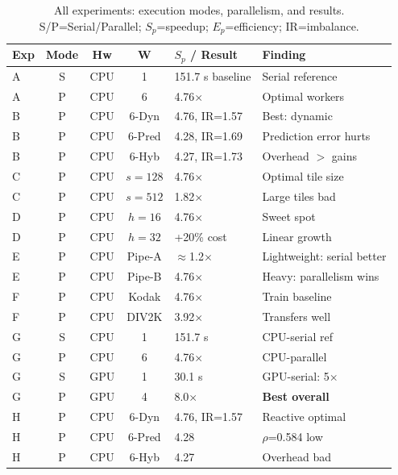 \documentclass[acmsmall]{acmart}
\begin{document}
\begin{table}[htbp]
  \centering
  \small
  \renewcommand{\arraystretch}{0.95}
  \caption{All experiments: execution modes, parallelism, and results. S/P=Serial/Parallel; $S_p$=speedup; $E_p$=efficiency; IR=imbalance.}
  \label{tab:execution_summary}
  \begin{tabularx}{1.0\textwidth}{lcccll}
    \toprule
    \textbf{Exp} & \textbf{Mode} & \textbf{Hw} & \textbf{W} & \textbf{$S_p$ / Result} & \textbf{Finding} \\
    \midrule
    A & S & CPU & 1 & 151.7 s baseline & Serial reference \\
    A & P & CPU & 6 & 4.76$\times$ & Optimal workers \\
    \midrule
    B & P & CPU & 6-Dyn & 4.76, IR=1.57 & Best: dynamic \\
    B & P & CPU & 6-Pred & 4.28, IR=1.69 & Prediction error hurts \\
    B & P & CPU & 6-Hyb & 4.27, IR=1.73 & Overhead $>$ gains \\
    \midrule
    C & P & CPU & $s=128$ & 4.76$\times$ & Optimal tile size \\
    C & P & CPU & $s=512$ & 1.82$\times$ & Large tiles bad \\
    \midrule
    D & P & CPU & $h=16$ & 4.76$\times$ & Sweet spot \\
    D & P & CPU & $h=32$ & +20\% cost & Linear growth \\
    \midrule
    E & P & CPU & Pipe-A & $\approx$1.2$\times$ & Lightweight: serial better \\
    E & P & CPU & Pipe-B & 4.76$\times$ & Heavy: parallelism wins \\
    \midrule
    F & P & CPU & Kodak & 4.76$\times$ & Train baseline \\
    F & P & CPU & DIV2K & 3.92$\times$ & Transfers well \\
    \midrule
    G & S & CPU & 1 & 151.7 s & CPU-serial ref \\
    G & P & CPU & 6 & 4.76$\times$ & CPU-parallel \\
    G & S & GPU & 1 & 30.1 s & GPU-serial: 5$\times$ \\
    G & P & GPU & 4 & 8.0$\times$ & \textbf{Best overall} \\
    \midrule
    H & P & CPU & 6-Dyn & 4.76, IR=1.57 & Reactive optimal \\
    H & P & CPU & 6-Pred & 4.28 & $\rho$=0.584 low \\
    H & P & CPU & 6-Hyb & 4.27 & Overhead bad \\
    \bottomrule
  \end{tabularx}
\end{table}
\end{document}
